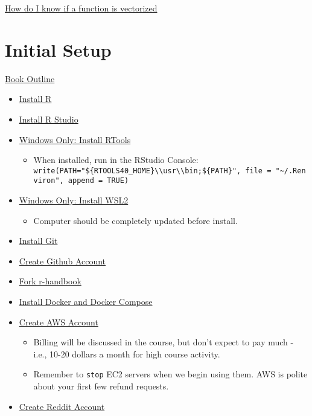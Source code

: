 \documentclass[
]{book}
\providecommand{\tightlist}{%
  \setlength{\itemsep}{0pt}\setlength{\parskip}{0pt}}
\begin{document}
\href{https://stackoverflow.com/questions/58568392/how-do-i-know-a-function-or-an-operation-in-r-is-vectorized\#:~:text=To\%20identify\%20if\%20an\%20R\%20object\%20is\%20a\%20vector\%20\%2C\%20I,a\%20vector\%20or\%20False\%20otherwise.}{How do I know if a function is vectorized}

\hypertarget{initial-setup}{%
\section{Initial Setup}\label{initial-setup}}

\href{https://hackmd.io/vGRGEPo8QQyiG8gecWv71g}{Book Outline}

\begin{itemize}
\item
  \href{https://cran.r-project.org/}{Install R}
\item
  \href{https://www.rstudio.com/products/rstudio/download/}{Install R Studio}
\item
  \href{https://cran.r-project.org/bin/windows/Rtools/}{Windows Only: Install RTools}

  \begin{itemize}
  \tightlist
  \item
    When installed, run in the RStudio Console: \texttt{write(\textquotesingle{}PATH="\$\{RTOOLS40\_HOME\}\textbackslash{}\textbackslash{}usr\textbackslash{}\textbackslash{}bin;\$\{PATH\}"\textquotesingle{},\ file\ =\ "\textasciitilde{}/.Renviron",\ append\ =\ TRUE)}
  \end{itemize}
\item
  \href{https://www.omgubuntu.co.uk/how-to-install-wsl2-on-windows-10}{Windows Only: Install WSL2}

  \begin{itemize}
  \tightlist
  \item
    Computer should be completely updated before install.
  \end{itemize}
\item
  \href{https://git-scm.com/downloads}{Install Git}
\item
  \href{https://github.com/}{Create Github Account}
\item
  \href{https://github.com/fdrennan/r-handbook}{Fork r-handbook}
\item
  \href{https://docs.docker.com/get-docker/}{Install Docker and Docker Compose}
\item
  \href{https://aws.amazon.com/}{Create AWS Account}

  \begin{itemize}
  \tightlist
  \item
    Billing will be discussed in the course, but don't expect to pay much - i.e., 10-20 dollars a month for high course activity.
  \item
    Remember to \texttt{stop} EC2 servers when we begin using them. AWS is polite about your first few refund requests.
  \end{itemize}
\item
  \href{reddit.com}{Create Reddit Account}


\end{itemize}
\end{document}
